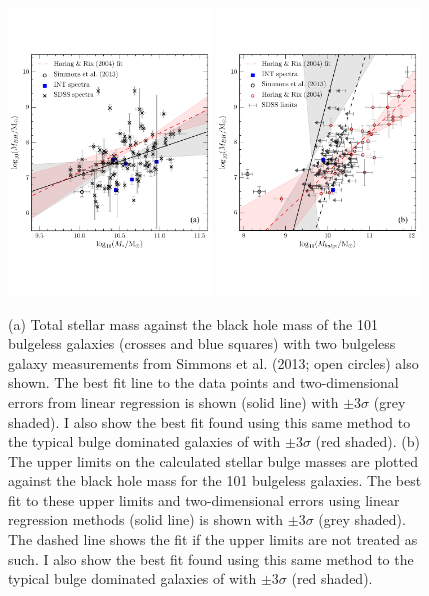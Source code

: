 \documentclass[12pt, usenatbib]{article}
\begin{document}
\begin{figure}[t]
\centering
\includegraphics[width=0.48\textwidth]{mass_bh_total_mass_fit_linmix_fit.pdf}
\includegraphics[width=0.48\textwidth]{mass_bh_bulge_limits_INT_simmons13_measurements_linmix_fit.pdf}
\caption{(a) Total stellar mass against the black hole mass of the 101 bulgeless galaxies (crosses and blue squares) with two bulgeless galaxy measurements from Simmons et al. (2013; open circles) also shown. The best fit line to the data points and two-dimensional errors from linear regression is shown (solid line) with $\pm3\sigma$ (grey shaded). I also show the best fit found using this same method to the typical bulge dominated galaxies of \protect\citet[][dashed line]{haringrix04} with $\pm3\sigma$ (red shaded). (b) The upper limits on the calculated stellar bulge masses are plotted against the black hole mass for the 101 bulgeless galaxies. The best fit to these upper limits and two-dimensional errors using linear regression methods (solid line) is shown with $\pm3\sigma$ (grey shaded). The dashed line shows the fit if the upper limits are not treated as such. I also show the best fit found using this same method to the typical bulge dominated galaxies of \protect\citet[][dashed line]{haringrix04} with $\pm3\sigma$ (red shaded).
}
\label{fig:bulgevsbh}
\end{figure}
\end{document}
